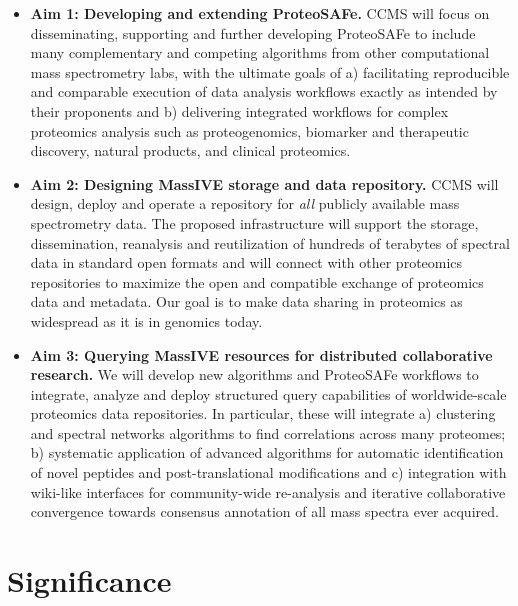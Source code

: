 \documentclass[arial,11pt]{article}
\begin{document}
\begin{itemize}
    \item {\bf Aim 1: Developing and extending ProteoSAFe.} CCMS will focus on disseminating, supporting and further developing ProteoSAFe to include many complementary and competing algorithms from other computational mass spectrometry labs, with the ultimate goals of a) facilitating reproducible and comparable execution of data analysis workflows exactly as intended by their proponents and b) delivering integrated workflows for complex proteomics analysis such as proteogenomics, biomarker and therapeutic discovery, natural products, and clinical proteomics.

    \item {\bf Aim 2: Designing MassIVE storage and data repository.} CCMS will design, deploy and operate a repository for {\em all} publicly available mass spectrometry data. The proposed infrastructure will support the storage, dissemination, reanalysis and reutilization of hundreds of terabytes of spectral data in standard open formats and will connect with other proteomics repositories to maximize the open and compatible exchange of proteomics data and metadata. Our goal is to make data sharing in proteomics as widespread as it is in genomics today.

    \item {\bf Aim 3: Querying MassIVE resources for distributed collaborative research.} We will develop new algorithms and ProteoSAFe workflows to integrate, analyze and deploy structured query capabilities of worldwide-scale proteomics data repositories. In particular, these will integrate a) clustering and spectral networks algorithms to find correlations
across many proteomes; b) systematic application of advanced algorithms for automatic identification of novel peptides and post-translational modifications and c) integration with wiki-like interfaces for community-wide re-analysis and iterative collaborative convergence towards consensus annotation of all mass spectra ever acquired.
\end{itemize}

\section{Significance}

\end{document}
